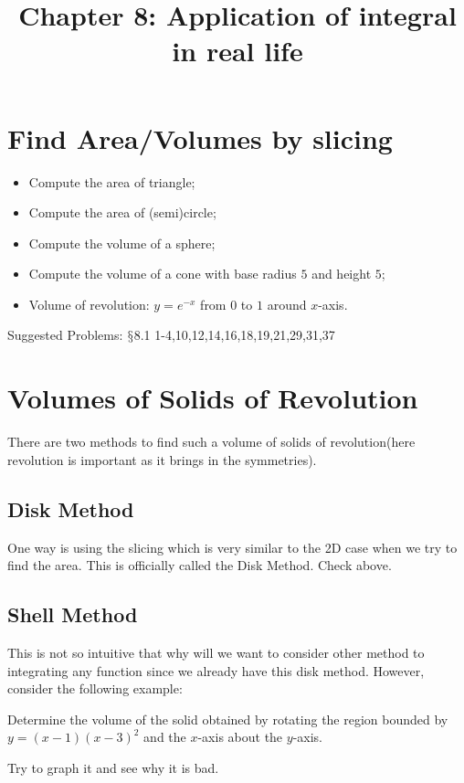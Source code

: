 \documentclass[12pt]{article}
\date{}
\title{Chapter 8: Application of integral in real life}
\theoremstyle{definition}
\theoremstyle{definition}
\theoremstyle{remark}
\theoremstyle{definition}
\theoremstyle{definition}
\theoremstyle{definition}
\begin{document}
\maketitle



\section{Find Area/Volumes by slicing}
\begin{itemize}
	\item Compute the area of triangle;
	\item Compute the area of (semi)circle;
	\item Compute the volume of a sphere; 
	\item Compute the volume of a cone with base radius $5$ and height $5$; 
	\item Volume of revolution: $y = e^{-x}$ from $0$ to $1$ around $x$-axis.
\end{itemize}

Suggested Problems: $\mathsection$8.1	1-4,10,12,14,16,18,19,21,29,31,37

\section{Volumes of Solids of Revolution}
There are two methods to find such a volume of solids of revolution(here revolution is important as it brings in the symmetries).
\subsection{Disk Method}

 One way is using the slicing which is very similar to the 2D case when we try to find the area. This is officially called the Disk Method.
Check above.

\subsection{Shell Method}

This is not so intuitive that why will we want to consider other method to integrating any function since we already have this disk method. However, consider the following example:

Determine the volume of the solid obtained by rotating the region bounded by $y=(x-1)(x-3)^2$ and the $x$-axis about the $y$-axis.

Try to graph it and see why it is bad.
\end{document}
